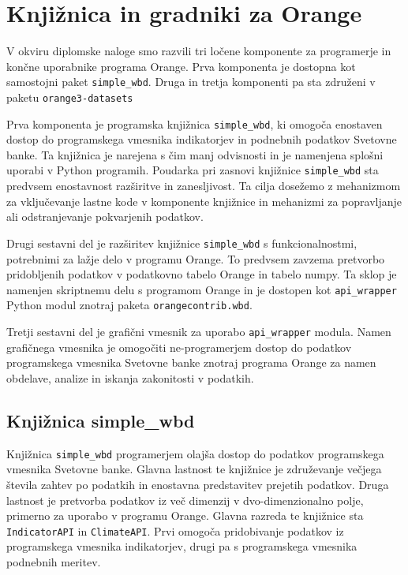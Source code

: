 
\chapter{Knjižnica in gradniki za Orange}

V okviru diplomske naloge smo razvili tri ločene komponente za programerje in
končne uporabnike programa Orange. Prva komponenta je
dostopna kot samostojni paket 
\verb|simple_wbd|. 
Druga in tretja komponenti pa sta združeni v paketu
\verb|orange3-datasets|

Prva komponenta je programska knjižnica \verb|simple_wbd|, ki
omogoča enostaven dostop do programskega vmesnika indikatorjev in podnebnih
podatkov Svetovne banke. Ta knjižnica je narejena s čim manj odvisnosti in je 
namenjena splošni uporabi v Python programih. Poudarka pri zasnovi knjižnice 
\verb|simple_wbd| sta predvsem enostavnost razširitve in zanesljivost. Ta cilja
dosežemo z mehanizmom za vključevanje lastne kode v komponente knjižnice
in mehanizmi za popravljanje ali odstranjevanje pokvarjenih podatkov.

Drugi sestavni del je razširitev knjižnice \verb|simple_wbd| s 
funkcionalnostmi, potrebnimi za lažje delo v programu Orange. To predvsem 
zavzema pretvorbo pridobljenih podatkov v podatkovno tabelo Orange in tabelo 
numpy. Ta sklop je namenjen skriptnemu delu s programom Orange 
\cite{orange_scripting} in je dostopen
kot \verb|api_wrapper| Python modul znotraj paketa \verb|orangecontrib.wbd|.

Tretji sestavni del je grafični vmesnik za uporabo \verb|api_wrapper| modula.
Namen grafičnega vmesnika je omogočiti ne-programerjem dostop do podatkov 
programskega vmesnika Svetovne banke znotraj programa Orange za namen obdelave,
analize in iskanja zakonitosti v podatkih.

\section{Knjižnica simple\_wbd}

Knjižnica \verb|simple_wbd| programerjem olajša dostop do podatkov 
programskega vmesnika Svetovne banke. Glavna lastnost te knjižnice je 
združevanje večjega števila zahtev po podatkih in enostavna predstavitev 
prejetih podatkov. Druga lastnost je pretvorba podatkov iz več dimenzij v 
dvo-dimenzionalno polje, primerno za uporabo v programu Orange. Glavna 
razreda te knjižnice sta \verb|IndicatorAPI| in \verb|ClimateAPI|. Prvi 
omogoča pridobivanje podatkov iz programskega vmesnika indikatorjev, drugi pa 
s programskega vmesnika podnebnih meritev.


